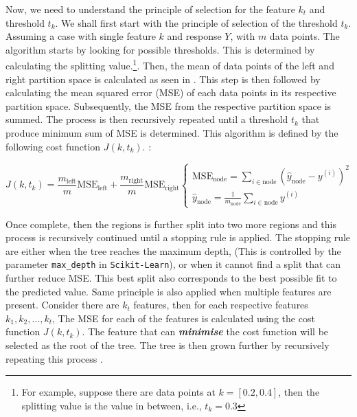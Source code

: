 Now, we need to understand the principle of selection for the feature $k_t$ and threshold $t_k$. We shall first start with the principle of selection of the threshold $t_k$. Assuming a case with single feature $k$ and response $Y$, with $m$ data points. The algorithm starts by looking for possible thresholds. This is determined by calculating the splitting value.\footnote{For example, suppose there are data points at $k = [0.2,0.4]$, then the splitting value is the value in between, i.e., $t_k = 0.3$}. Then, the mean of data points of the left and right partition space is calculated as seen in . This step is then followed by calculating the mean squared error (MSE) of each data points in its respective partition space. Subsequently, the MSE from the respective partition space is summed. The process is then recursively repeated until a threshold $t_k$ that produce minimum sum of MSE is determined. This algorithm is defined by the following cost function $J(k,t_k)$. \cite{Geron.2019}:

\begin{equation}\label{costfun}
    J(k,t_k) = \frac{m_{\text{left}}}{m}\text{MSE}_\text{left} + \frac{m_{\text{right}}}{m}\text{MSE}_\text{right}
    \begin{cases}
        \text{MSE}_\text{node} = \sum\limits_{i \in \text{node}}(\hat{y}_\text{node} - y^{(i)} )^2 \\
        \hat{y}_{\text{node}} = \frac{1}{m_{\text{node}}}\sum\limits_{i\in \text{node}} y ^ {(i)}
    \end{cases}   
\end{equation}

Once complete, then the regions is further split into two more regions and this process is recursively continued until a stopping rule is applied. The stopping rule are either when the tree reaches the maximum depth, (This is controlled by the parameter {\tt max\_depth} in {\tt Scikit-Learn}), or when it cannot find a split that can further reduce MSE. This best split also corresponds to the best possible fit to the predicted value. Same principle is also applied when multiple features are present. Consider there are $k_t$ features, then for each respective features $k_1,k_2,\dots,k_t$, The MSE for each of the features is calculated using the cost function $J(k,t_k)$. The feature that can \emph{\textbf{minimise}} the cost function will be selected as the root of the tree. The tree is then grown further by recursively repeating this process \cite{Hastie.2009,Geron.2019}.\\

